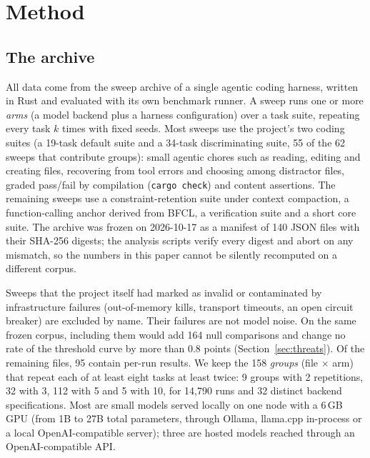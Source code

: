 
\section{Method}\label{sec:method}

\subsection{The archive}\label{sec:archive}
All data come from the sweep archive of a single agentic coding harness, written
in Rust and evaluated with its own benchmark runner. A sweep runs one or more
\emph{arms} (a model backend plus a harness configuration) over a task suite,
repeating every task $k$ times with fixed seeds. Most sweeps use the project's
two coding suites (a 19-task default suite and a 34-task discriminating suite, 55
of the 62 sweeps that contribute groups): small agentic chores such as reading,
editing and creating files, recovering from tool errors and choosing among
distractor files, graded pass/fail by compilation (\texttt{cargo check}) and
content assertions. The remaining sweeps use a constraint-retention suite under
context compaction, a function-calling anchor derived from BFCL, a verification
suite and a short core suite. The archive was frozen on
2026-10-17 as a manifest of 140 JSON files with their SHA-256 digests; the
analysis scripts verify every digest and abort on any mismatch, so the numbers
in this paper cannot be silently recomputed on a different corpus.

Sweeps that the project itself had marked as invalid or contaminated by
infrastructure failures (out-of-memory kills, transport timeouts, an open
circuit breaker) are excluded by name. Their failures are not model noise. On the same frozen corpus, including them would add 164 null comparisons and change no rate of the threshold curve by more than 0.8 points (Section~\ref{sec:threats}). Of the remaining files, 95 contain per-run results. We keep the
158 \emph{groups} (file $\times$ arm) that repeat each of at least eight tasks
at least twice: 9 groups with 2 repetitions, 32 with 3, 112 with 5 and 5 with
10, for 14{,}790 runs and 32 distinct backend specifications. Most are small
models served locally on one node with a 6\,GB GPU (from 1B to 27B total
parameters, through Ollama, llama.cpp in-process or a local OpenAI-compatible
server); three are hosted models reached through an OpenAI-compatible API.

